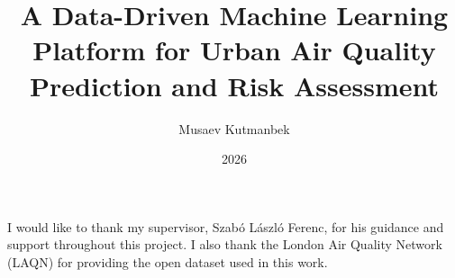 \documentclass[
]{elteikthesis}[2024/04/26]
\title{A Data-Driven Machine Learning Platform for Urban Air Quality Prediction and Risk Assessment} %
\date{2026} %
\author{Musaev Kutmanbek}
\affiliation{Associate Professor and Chair} %
\begin{document}

\maketitle

\tableofcontents
\cleardoublepage


\cleardoublepage


\cleardoublepage


\cleardoublepage


\cleardoublepage

\chapter*{\acklabel}
I would like to thank my supervisor, Szabó László Ferenc, for his guidance and support throughout this project. I also thank the London Air Quality Network (LAQN) for providing the open dataset used in this work.

{}
\printbibliography[title=\biblabel]
\cleardoublepage

{}
\listoffigures
\cleardoublepage

{}
\listoftables
\cleardoublepage
\end{document}
